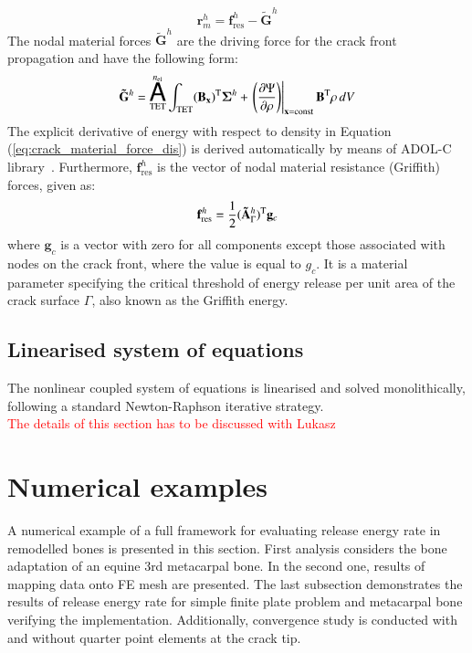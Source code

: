 \documentclass[11pt]{acmeArticle}
\DeclareMathOperator*{\aoperator}{ \text{\huge${\mathsf{A}}$}}
\numberwithin{equation}{section}
\begin{document}
\begin{equation}
\mathbf r_m^h = \mathbf f^h_{\text{res}} - \mathbf{\tilde G}^h
\end{equation}
The nodal material forces $\mathbf{\tilde G}^h$ are the driving force for the crack front propagation and have the following form:
\begin{equation}\label{eq:crack_material_force_dis}
\mathbf{\tilde G}^h = \aoperator_{\text{TET}}^{n_{\rm {el}}} \int_\text{TET} (\mathbf{B_x})^{\rm T} {\bm {\Sigma}}^h +   \left.\left( \frac{\partial \Psi}{\partial \rho} \right)\right|_{\mathbf{x}= \text {const}} \mathbf B^{\rm T} \rho \mathrm \,d V
\end{equation}
The explicit derivative of energy with respect to density in Equation (\ref{eq:crack_material_force_dis}) is derived automatically by means of ADOL-C library~\citep{Walther2009}. Furthermore, $\mathbf f^h_{\text {res}}$ is the vector of nodal material resistance (Griffith) forces, given as:
\begin{equation}
\mathbf f^h_{\text{res}} = \frac{1}{2} (\mathbf{\tilde A}^h_\Gamma)^{\rm T} \mathbf g_c
\end{equation}
where $ \mathbf g_c$ is a vector with zero for all components except those associated with nodes on the crack front, where the value is equal to $g_c$. It is a material parameter specifying the critical threshold of energy release per unit area of the crack surface $\Gamma$, also known as the Griffith energy.
\subsection{Linearised system of equations}
The nonlinear coupled system of equations is linearised and solved monolithically, following a standard Newton-Raphson iterative strategy. \\

\textcolor{red}{The details of this section has to be discussed with Lukasz}

\section{Numerical examples}
\label{sec:numerical_examples}
A numerical example of a full framework for evaluating release energy rate in remodelled bones is presented in this section. First analysis considers the bone adaptation of an equine 3rd metacarpal bone. In the second one, results of mapping data onto FE mesh are presented. The last subsection demonstrates the results of release energy rate for simple finite plate problem and metacarpal bone verifying the implementation. Additionally, convergence study is conducted with and without quarter point elements at the crack tip.
\end{document}
